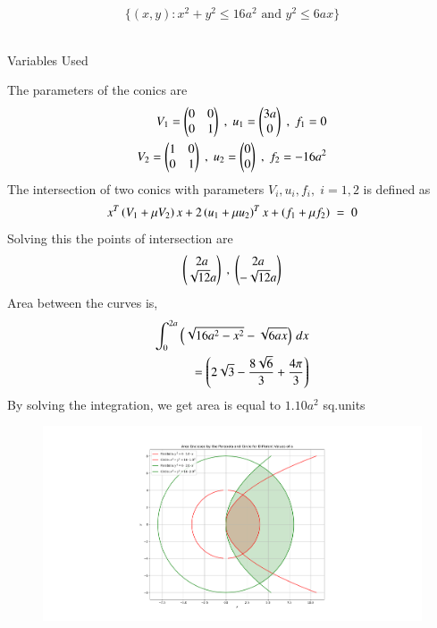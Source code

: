 \documentclass[journal]{IEEEtran}
\begin{document}
\[
\{(x,y) : x^2 + y^2 \leq 16a^2 \text{ and } y^2 \leq 6ax\}
\]
\\
\solution
\begin{table}[h!]    
  \centering
  
  \caption{Variables Used}
  \label{tab1-1.2-20}
\end{table}
The parameters of the conics are
\begin{align}
V_1=\begin{pmatrix}0 & 0 \\ 0 & 1\end{pmatrix}\;,\;u_1=\begin{pmatrix}3a\\0\end{pmatrix} \;,\;f_1=0\\
V_2=\begin{pmatrix}1 & 0 \\ 0 & 1\end{pmatrix}\;,\;u_2=\begin{pmatrix}0\\0\end{pmatrix}\;,\;f_2=-16a^2
\end{align}
The intersection of two conics with parameters $V_i,u_i,f_i,\;i= 1,2$ is defined as
\begin{align}
x^T\left(V_1+\mu V_2\right)x+2\left(u_1+\mu u_2\right)^T x + \left(f_1+\mu f_2\right)\;=\;0
\end{align}
Solving this the points of intersection are
\begin{align}
\begin{pmatrix}2a\\\sqrt{12}a\end{pmatrix}\;,\;\begin{pmatrix}2a\\-\sqrt{12}a\end{pmatrix}
\end{align}
Area between the curves is,
\begin{align}
\int_{0}^{2a} \left(\sqrt{16a^2-x^2}-\sqrt{6ax}\right) \, dx \\
=\left(2\sqrt{3}-\frac{8\sqrt{6}}{3}+\frac{4\pi}{3}\right)
\end{align}
By solving the integration, we get area is equal to $1.10a^2$ sq.units
\begin{figure}[h!]
   \centering
   \includegraphics[width=\linewidth]{figs/figure_1.png}
   \label{stemplot}
   \caption{}
\end{figure}
\end{document}
